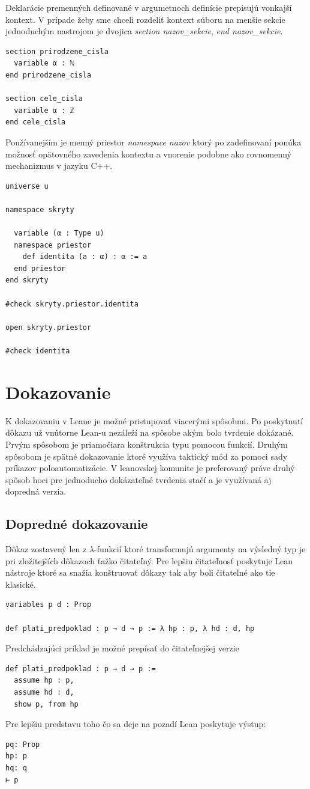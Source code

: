 \documentclass[a4paper,10pt,oneside]{report}%
\begin{document}
    Deklarácie premenných definované v argumetnoch definície prepisujú vonkajší kontext.
    V prípade žeby sme chceli rozdeliť kontext súboru na menšie sekcie jednoduchým
nastrojom je dvojica \emph{section nazov\_sekcie}, \emph{end nazov\_sekcie}.
\begin{lstlisting}
section prirodzene_cisla
  variable α : ℕ
end prirodzene_cisla

section cele_cisla
  variable α : ℤ
end cele_cisla
\end{lstlisting}
    Používanejším je menný priestor \emph{namespace nazov} ktorý po zadefinovaní ponúka
možnosť opätovného zavedenia kontextu a vnorenie podobne ako rovnomenný mechanizmus
v jazyku C++.
\begin{lstlisting}
universe u

namespace skryty

  variable (α : Type u)
  namespace priestor
    def identita (a : α) : α := a
  end priestor
end skryty

#check skryty.priestor.identita

open skryty.priestor

#check identita
\end{lstlisting}
\section{Dokazovanie}

    K dokazovaniu v Leane je možné pristupovať viacerými spôsobmi.
    Po poskytnutí dôkazu už vnútorne Lean-u nezáleží na spôsobe akým bolo tvrdenie
dokázané.
    Prvým spôsobom je priamočiara konštrukcia typu pomocou funkcií.
    Druhým spôsobom je spätné dokazovanie ktoré využíva taktický mód za pomoci
sady príkazov poloautomatizácie.
    V leanovskej komunite je preferovaný práve druhý spôsob hoci pre jednoducho
dokázateľné tvrdenia stačí a je využívaná aj dopredná verzia.

\subsection{Dopredné dokazovanie}
    Dôkaz zostavený len z $\lambda$-funkcií ktoré transformujú argumenty
na výsledný typ je pri zložitejších dôkazoch ťažko čitateľný.
    Pre lepšiu čitateľnosť poskytuje Lean nástroje ktoré sa snažia konštruovať dôkazy tak
aby boli čitateľné ako tie klasické.
\begin{lstlisting}
variables p d : Prop

def plati_predpoklad : p → d → p := λ hp : p, λ hd : d, hp
\end{lstlisting}
    Predchádzajúci príklad je možné prepísať do čitateľnejšej verzie
\begin{lstlisting}
def plati_predpoklad : p → d → p :=
  assume hp : p,
  assume hd : d,
  show p, from hp
\end{lstlisting}
Pre lepšiu predstavu toho čo sa deje na pozadí Lean poskytuje výstup:
\begin{lstlisting}
pq: Prop
hp: p
hq: q
⊢ p
\end{lstlisting}
\end{document}
